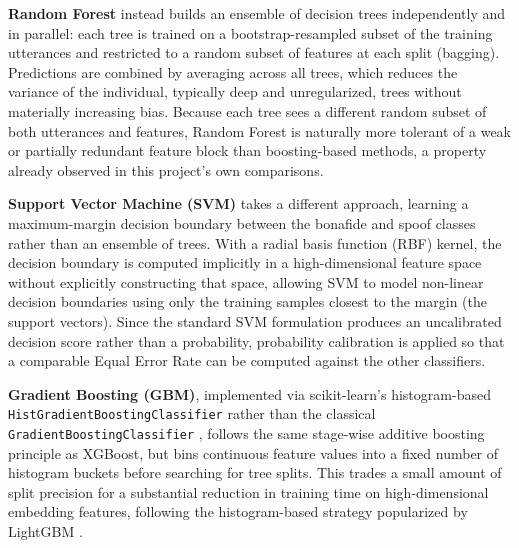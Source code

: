 \textbf{Random Forest} \cite{Breiman2001_rf} instead builds an ensemble of decision trees independently and in parallel: each tree is trained on a bootstrap-resampled subset of the training utterances and restricted to a random subset of features at each split (bagging). Predictions are combined by averaging across all trees, which reduces the variance of the individual, typically deep and unregularized, trees without materially increasing bias. Because each tree sees a different random subset of both utterances and features, Random Forest is naturally more tolerant of a weak or partially redundant feature block than boosting-based methods, a property already observed in this project's own comparisons.

\textbf{Support Vector Machine (SVM)} \cite{Cortes1995_svm} takes a different approach, learning a maximum-margin decision boundary between the bonafide and spoof classes rather than an ensemble of trees. With a radial basis function (RBF) kernel, the decision boundary is computed implicitly in a high-dimensional feature space without explicitly constructing that space, allowing SVM to model non-linear decision boundaries using only the training samples closest to the margin (the support vectors). Since the standard SVM formulation produces an uncalibrated decision score rather than a probability, probability calibration is applied so that a comparable Equal Error Rate can be computed against the other classifiers.

\textbf{Gradient Boosting (GBM)}, implemented via scikit-learn's histogram-based \texttt{HistGradientBoostingClassifier} \cite{Pedregosa2011_sklearn, Ke2017_lightgbm} rather than the classical \texttt{GradientBoostingClassifier} \cite{Friedman2001_gb}, follows the same stage-wise additive boosting principle as XGBoost, but bins continuous feature values into a fixed number of histogram buckets before searching for tree splits. This trades a small amount of split precision for a substantial reduction in training time on high-dimensional embedding features, following the histogram-based strategy popularized by LightGBM \cite{Ke2017_lightgbm}.

